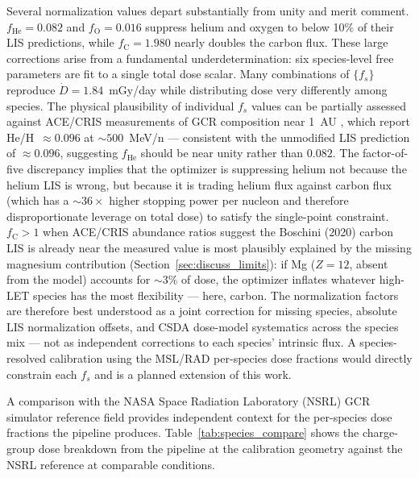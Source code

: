 Several normalization values depart substantially from unity and merit
comment.
$f_\mathrm{He} = 0.082$ and $f_\mathrm{O} = 0.016$ suppress helium and
oxygen to below 10\% of their LIS predictions, while
$f_\mathrm{C} = 1.980$ nearly doubles the carbon flux.
These large corrections arise from a fundamental underdetermination:
six species-level free parameters are fit to a single total dose scalar.
Many combinations of $\{f_s\}$ reproduce $\dot{D} = 1.84$~mGy/day
while distributing dose very differently among species.
The physical plausibility of individual $f_s$ values can be partially
assessed against ACE/CRIS measurements of GCR composition near
1~AU \citep{stone1998}, which report He/H~$\approx 0.096$ at
$\sim\!500$~MeV/n — consistent with the unmodified LIS prediction of
$\approx 0.096$, suggesting $f_\mathrm{He}$ should be near unity rather
than $0.082$.
The factor-of-five discrepancy implies that the optimizer is
suppressing helium not because the helium LIS is wrong, but because
it is trading helium flux against carbon flux (which has a
$\sim\!36\times$ higher stopping power per nucleon and therefore
disproportionate leverage on total dose) to satisfy the single-point
constraint.
$f_\mathrm{C} > 1$ when ACE/CRIS abundance ratios suggest the
Boschini (2020) carbon LIS is already near the measured value is
most plausibly explained by the missing magnesium contribution
(Section~\ref{sec:discuss_limits}): if Mg ($Z=12$, absent from the
model) accounts for $\sim\!3\%$ of dose, the optimizer inflates
whatever high-LET species has the most flexibility — here, carbon.
The normalization factors are therefore best understood as a joint
correction for missing species, absolute LIS normalization offsets, and
CSDA dose-model systematics across the species mix — not as independent
corrections to each species' intrinsic flux.
A species-resolved calibration using the MSL/RAD per-species dose
fractions \citep{zeitlin2013} would directly constrain each $f_s$
and is a planned extension of this work.

A comparison with the NASA Space Radiation Laboratory (NSRL) GCR
simulator reference field \citep{slaba2016} provides independent
context for the per-species dose fractions the pipeline produces.
Table~\ref{tab:species_compare} shows the charge-group dose breakdown
from the pipeline at the calibration geometry against the NSRL
reference at comparable conditions.

